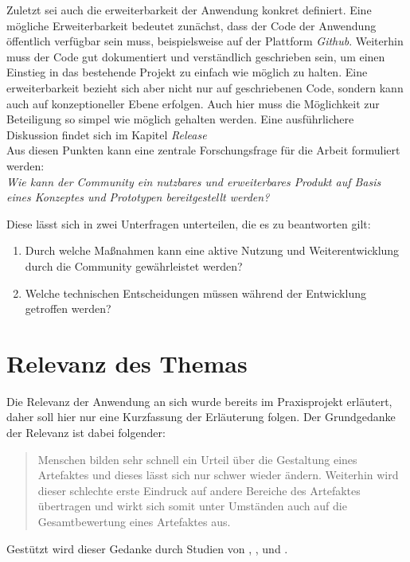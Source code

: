 Zuletzt sei auch die erweiterbarkeit der Anwendung konkret definiert. Eine mögliche Erweiterbarkeit bedeutet zunächst, dass der Code der Anwendung öffentlich verfügbar sein muss, beispielsweise auf der Plattform \textit{Github}. Weiterhin muss der Code gut dokumentiert und verständlich geschrieben sein, um einen Einstieg in das bestehende Projekt zu einfach wie möglich zu halten. Eine erweiterbarkeit bezieht sich aber nicht nur auf geschriebenen Code, sondern kann auch auf konzeptioneller Ebene erfolgen. Auch hier muss die Möglichkeit zur Beteiligung so simpel wie möglich gehalten werden. Eine ausführlichere Diskussion findet sich im Kapitel \textit{Release}\\

Aus diesen Punkten kann eine zentrale Forschungsfrage für die Arbeit formuliert werden:\\
\textit{Wie kann der Community ein nutzbares und erweiterbares Produkt auf Basis eines Konzeptes und Prototypen bereitgestellt werden?}

Diese lässt sich in zwei Unterfragen unterteilen, die es zu beantworten gilt:

\begin{enumerate}
  \item Durch welche Maßnahmen kann eine aktive Nutzung und Weiterentwicklung durch die Community gewährleistet werden?
  \item Welche technischen Entscheidungen müssen während der Entwicklung getroffen werden?
\end{enumerate}

\section{Relevanz des Themas}
\label{sec:relevance}
Die Relevanz der Anwendung an sich wurde bereits im Praxisprojekt erläutert, daher soll hier nur eine Kurzfassung der Erläuterung folgen. Der Grundgedanke der Relevanz ist dabei folgender:
\begin{quote}
  Menschen bilden sehr schnell ein Urteil über die Gestaltung eines Artefaktes und dieses lässt sich nur schwer wieder ändern. Weiterhin wird dieser schlechte erste Eindruck auf andere Bereiche des Artefaktes übertragen und wirkt sich somit unter Umständen auch auf die Gesamtbewertung eines Artefaktes aus.
\end{quote}

Gestützt wird dieser Gedanke durch Studien von \cite{lindgaard2006attention}, \cite{campbell1996fitting}, und \cite{nickerson1998confirmation}.

